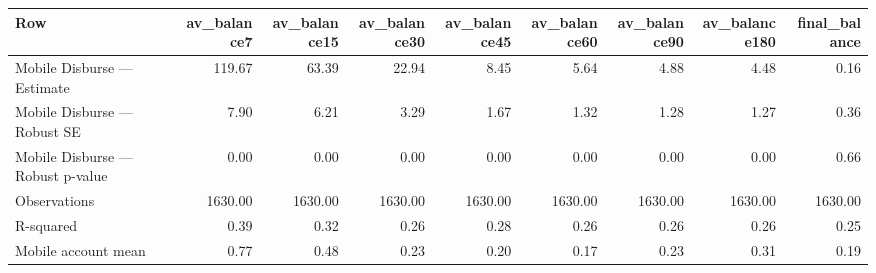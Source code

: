 
\begin{tabular}{lrrrrrrrr}
\toprule
Row & av\_balance7 & av\_balance15 & av\_balance30 & av\_balance45 & av\_balance60 & av\_balance90 & av\_balance180 & final\_balance\\
\midrule
Mobile Disburse — Estimate & 119.67 & 63.39 & 22.94 & 8.45 & 5.64 & 4.88 & 4.48 & 0.16\\
Mobile Disburse — Robust SE & 7.90 & 6.21 & 3.29 & 1.67 & 1.32 & 1.28 & 1.27 & 0.36\\
Mobile Disburse — Robust p-value & 0.00 & 0.00 & 0.00 & 0.00 & 0.00 & 0.00 & 0.00 & 0.66\\
Observations & 1630.00 & 1630.00 & 1630.00 & 1630.00 & 1630.00 & 1630.00 & 1630.00 & 1630.00\\
R-squared & 0.39 & 0.32 & 0.26 & 0.28 & 0.26 & 0.26 & 0.26 & 0.25\\
\addlinespace
Mobile account mean & 0.77 & 0.48 & 0.23 & 0.20 & 0.17 & 0.23 & 0.31 & 0.19\\
\bottomrule
\end{tabular}
